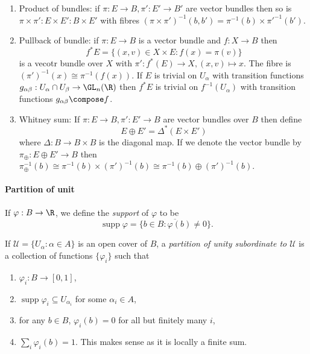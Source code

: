 \documentclass[a4paper]{article}
\DeclareMathOperator{\supp}{supp} %
\begin{document}
\begin{eg}
\begin{enumerate}
  \item Product of bundles: if \(\pi: E \to B, \pi': E' \to B'\) are vector bundles then so is \(\pi \times \pi': E \times E': B \times E'\) with fibres \((\pi \times \pi')^{-1}(b, b') = \pi^{-1}(b) \times \pi'^{-1}(b')\).
  \item Pullback of bundle: if \(\pi: E \to B\) is a vector bundle and \(f: X \to B\) then
    \[
      f^*E = \{(x, v) \in X \times E: f(x) = \pi(v)\}
    \]
    is a vecotr bundle over \(X\) with \(\pi': f^*(E) \to X, (x, v) \mapsto x\). The fibre is \((\pi')^{-1}(x) \cong \pi^{-1}(f(x))\). If \(E\) is trivial on \(U_\alpha\) with transition functions \(g_{\alpha\beta}: U_\alpha \cap U_\beta \to \GL_n(\R)\) then \(f^*E\) is trivial on \(f^{-1}(U_\alpha)\) with transition functions \(g_{\alpha\beta} \compose f\).
  \item Whitney sum: If \(\pi: E \to B, \pi': E' \to B\) are vector bundles over \(B\) then define
    \[
      E \oplus E' = \Delta^*(E \times E')
    \]
    where \(\Delta: B \to B \times B\) is the diagonal map. If we denote the vector bundle by \(\pi_\oplus: E \oplus E' \to B\) then \(\pi_\oplus^{-1}(b) \cong \pi^{-1}(b) \times (\pi')^{-1}(b) \cong \pi^{-1}(b) \oplus (\pi')^{-1}(b)\).
  \end{enumerate}
\end{eg}

\paragraph{Partition of unit}

\begin{definition}[support]
  If \(\varphi: B \to \R\), we define the \emph{support} of \(\varphi\) to be
  \[
    \supp \varphi = \overline{\{b \in B: \varphi(b) \neq 0\}}.
  \]
\end{definition}

\begin{definition}
  If \(\mathcal U = \{U_\alpha: \alpha \in A\}\) is an open cover of \(B\), a \emph{partition of unity subordinate to \(\mathcal U\)} is a collection of functions \(\{\varphi_i\}\) such that
  \begin{enumerate}
  \item \(\varphi_i: B \to [0, 1]\),
  \item \(\supp \varphi_i \subseteq U_{\alpha_i}\) for some \(\alpha_i \in A\),
  \item for any \(b \in B\), \(\varphi_i(b) = 0\) for all but finitely many \(i\),
  \item \(\sum_i \varphi_i(b) = 1\). This makes sense as it is locally a finite sum.
  \end{enumerate}
\end{definition}
\end{document}

